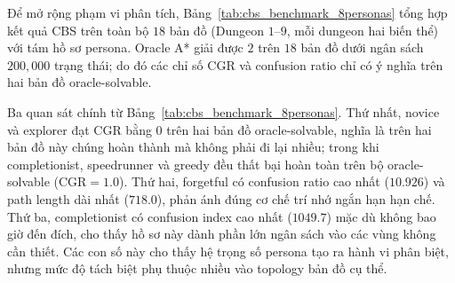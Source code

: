 \documentclass[oneside,a4paper,12pt]{extreport}
\begin{document}
Để mở rộng phạm vi phân tích, Bảng~\ref{tab:cbs_benchmark_8personas} tổng hợp kết quả CBS trên toàn bộ $18$ bản đồ (Dungeon $1$--$9$, mỗi dungeon hai biến thể) với tám hồ sơ persona. Oracle A* giải được $2$ trên $18$ bản đồ dưới ngân sách $200{,}000$ trạng thái; do đó các chỉ số CGR và confusion ratio chỉ có ý nghĩa trên hai bản đồ oracle-solvable.

\begin{table}[H]
\centering
\small
\setlength{\tabcolsep}{4pt}
\renewcommand{\arraystretch}{1.08}
\caption{CBS benchmark trên 18 bản đồ corpus thật với 8 hồ sơ persona}
\label{tab:cbs_benchmark_8personas}
\end{table}

Ba quan sát chính từ Bảng~\ref{tab:cbs_benchmark_8personas}. Thứ nhất, novice và explorer đạt CGR bằng $0$ trên hai bản đồ oracle-solvable, nghĩa là trên hai bản đồ này chúng hoàn thành mà không phải đi lại nhiều; trong khi completionist, speedrunner và greedy đều thất bại hoàn toàn trên bộ oracle-solvable (CGR$=1.0$). Thứ hai, forgetful có confusion ratio cao nhất ($10.926$) và path length dài nhất ($718.0$), phản ánh đúng cơ chế trí nhớ ngắn hạn hạn chế. Thứ ba, completionist có confusion index cao nhất ($1049.7$) mặc dù không bao giờ đến đích, cho thấy hồ sơ này dành phần lớn ngân sách vào các vùng không cần thiết. Các con số này cho thấy hệ trọng số persona tạo ra hành vi phân biệt, nhưng mức độ tách biệt phụ thuộc nhiều vào topology bản đồ cụ thể.
\end{document}
